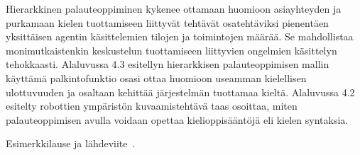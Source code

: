 \documentclass[finnish]{tktltiki2}
\theoremstyle{definition}
\theoremstyle{remark}
\begin{document}
Hierarkkinen palauteoppiminen kykenee ottamaan huomioon asiayhteyden ja purkamaan kielen tuottamiseen liittyvät tehtävät osatehtäviksi pienentäen yksittäisen agentin käsittelemien tilojen ja toimintojen määrää. Se mahdollistaa monimutkaistenkin keskustelun tuottamiseen liittyvien ongelmien käsittelyn tehokkaasti. Alaluvussa 4.3 esitellyn hierarkkisen palauteoppimisen mallin käyttämä palkintofunktio osasi ottaa huomioon useamman kielellisen ulottuvuuden ja osaltaan kehittää järjestelmän tuottamaa kieltä. Alaluvussa 4.2 esitelty robottien ympäristön kuvaamistehtävä taas osoittaa, miten palauteoppimisen avulla voidaan opettaa kielioppisääntöjä eli kielen syntaksia.

Esimerkkilause ja lähdeviite~\cite{dec15}.
\cite{khs07}
\cite{bes08}
\cite{lep98}
\cite{arm11}
\cite{ber57}
\cite{bes08}
\cite{let12}
\cite{lim15}
\cite{mam15}
\cite{mia16}
\cite{ril11}
\cite{scw06}
\cite{sub98}
%
%
% 
%







% 
\end{document}
